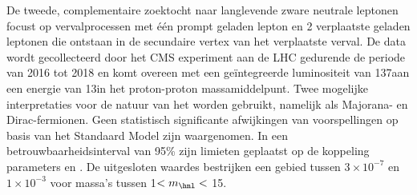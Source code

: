\begin{extraAbstract}
De tweede, complementaire zoektocht naar langlevende zware neutrale leptonen focust op vervalprocessen met \'e\'en prompt geladen lepton
en 2 verplaatste geladen leptonen die ontstaan in de secundaire vertex van het verplaatste \hnl verval.
De data wordt gecollecteerd door het CMS experiment aan de LHC gedurende de periode van 2016 tot 2018 en komt overeen met een ge\"integreerde luminositeit
van 137\fbinv aan een energie van 13\TeV in het proton-proton massamiddelpunt. Twee mogelijke interpretaties voor de natuur van het \hnl worden gebruikt, namelijk als Majorana- en Dirac-fermionen.
Geen statistisch significante afwijkingen van voorspellingen op basis van het Standaard Model zijn waargenomen.
In een betrouwbaarheidsinterval van 95\% zijn limieten geplaatst op de koppeling parameters \mixpare en \mixparm. De uitgesloten waardes bestrijken een gebied
tussen $3\times 10^{-7}$ en $1\times 10^{-3}$ voor \hnl massa's tussen 1\GeV $< m_\hnl <$ 15\GeV.
























\end{extraAbstract}
